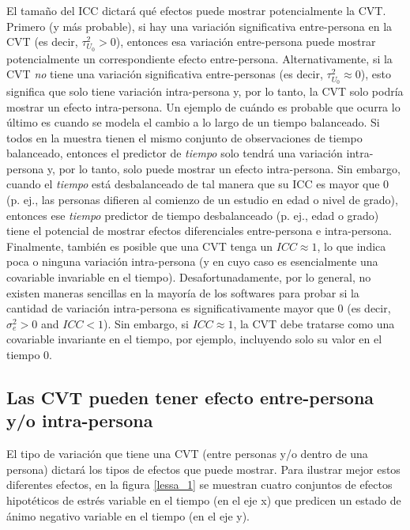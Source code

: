 \documentclass[spanish]{article}
\numberwithin{figure}{subsection}
\numberwithin{equation}{subsection}
\numberwithin{table}{subsection}
\begin{document}
El tamaño del ICC dictará qué efectos puede mostrar potencialmente la CVT.
Primero (y más probable), si hay una variación significativa entre-persona en
la CVT (es decir, $\tau^2_{U_0} > 0$), entonces esa variación entre-persona
puede mostrar potencialmente un correspondiente efecto entre-persona.
Alternativamente, si la CVT \textit{no} tiene una variación significativa
entre-personas (es decir, $\tau^2_{U_0} \approx 0$), esto significa que solo
tiene variación intra-persona y, por lo tanto, la CVT solo podría mostrar un
efecto intra-persona. Un ejemplo de cuándo es probable que ocurra lo último es
cuando se modela el cambio a lo largo de un tiempo balanceado. Si todos en la
muestra tienen el mismo conjunto de observaciones de tiempo balanceado,
entonces el predictor de \textit{tiempo} solo tendrá una variación
intra-persona y, por lo tanto, solo puede mostrar un efecto intra-persona. Sin
embargo, cuando el \textit{tiempo} está desbalanceado de tal manera que su ICC
es mayor que 0 (p. ej., las personas difieren al comienzo de un estudio en edad
o nivel de grado), entonces ese \textit{tiempo} predictor de tiempo
desbalanceado (p. ej., edad o grado) tiene el potencial de mostrar efectos
diferenciales entre-persona e intra-persona. Finalmente, también es posible que
una CVT tenga un $ICC \approx 1$, lo que indica poca o ninguna variación
intra-persona (y en cuyo caso es esencialmente una covariable invariable en el
tiempo). Desafortunadamente, por lo general, no existen maneras sencillas en la
mayoría de los softwares para probar si la cantidad de variación intra-persona
es significativamente mayor que 0 (es decir, $\sigma^2_e > 0$ and $ICC < 1$).
Sin embargo, si $ICC \approx 1$, la CVT debe tratarse como una covariable
invariante en el tiempo, por ejemplo, incluyendo solo su valor en el tiempo 0.

\subsection{Las CVT pueden tener efecto entre-persona y/o intra-persona}

El tipo de variación que tiene una CVT (entre personas y/o dentro de una
persona) dictará los tipos de efectos que puede mostrar. Para ilustrar mejor
estos diferentes efectos, en la figura \ref{lessa_1} se muestran cuatro
conjuntos de efectos hipotéticos de estrés variable en el tiempo (en el eje x)
que predicen un estado de ánimo negativo variable en el tiempo (en el eje y).
\end{document}
